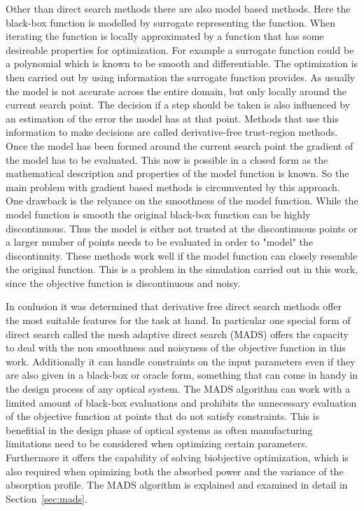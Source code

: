 \documentclass[a4paper,10pt]{article}
\newcommand{\secref}[1]{Section~\ref{#1}}
\begin{document}
    Other than direct search methods there are also model based
    methods.
    Here the black-box function is modelled by surrogate representing
    the function.
    When iterating the function is locally approximated by a function
    that has some desireable properties for optimization.
    For example a surrogate function could be a polynomial
    which is known to be smooth and differentiable.
    The optimization is then carried out by using information
    the surrogate function provides.
    As usually the model is not accurate across the entire domain,
    but only locally around the current search point.
    The decision if a step should be taken is also influenced
    by an estimation of the error the model has at that point.
    Methods that use this information to make decisions are called
    derivative-free trust-region methods.
    Once the model has been formed around the current search point
    the gradient of the model has to be evaluated.
    This now is possible in a closed form as the mathematical description
    and properties of the model function is known.
    So the main problem with gradient based methods is circumvented
    by this approach.
    One drawback is the relyance on the smoothness of the model function.
    While the model function is smooth the original black-box
    function can be highly discontinuous.
    Thus the model is either not trusted at the discontinuous points
    or a larger number of points needs to be evaluated in order to
    "model" the discontinuity.
    These methods work well if the model function can closely resemble
    the original function.
    This is a problem in the simulation carried out in this work, since
    the objective function is discontinuous and noisy.
    
    In conlusion it was determined that derivative free direct search
    methods offer the most suitable features for the task at hand.
    In particular one special form of direct search called the
    mesh adaptive direct search (MADS) offers the capacity to
    deal with the non smoothness and noisyness of the objective
    function in this work.
    Additionally it can handle constraints on the input parameters
    even if they are also given in a black-box or oracle form,
    something that can come in handy in the design process of 
    any optical system.
    The MADS algorithm can work with a limited amount of black-box
    evaluations and prohibits the unnecessary evaluation of
    the objective function at points that do not satisfy constraints.
    This is benefitial in the design phase of optical systems as
    often manufacturing limitations need to be considered when
    optimizing certain parameters. 
    Furthermore it offers the capability of solving biobjective
    optimization, which is also required when opimizing both
    the absorbed power and the variance of the absorption profile.
    The MADS algorithm is explained and examined in detail in 
    \secref{sec:mads}.
    
\end{document}
